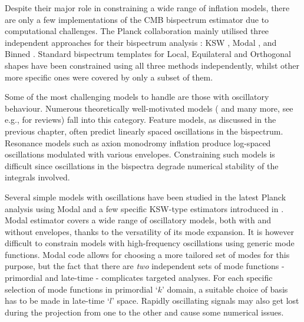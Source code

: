 \documentclass[a4paper,12pt,times,custombib,print,index]{Classes/PhDThesisPSnPDF} %
\providecommand{\DIFadd}[1]{{\protect\color{blue}\uwave{#1}}} %
\providecommand{\DIFaddbegin}{} %
\providecommand{\DIFaddend}{} %
\newcommand{\DIFaddincludegraphics}[2][]{{\color{blue}\fbox{\DIFOincludegraphics[#1]{#2}}}} %
\DeclareRobustCommand{\DIFaddbegin}{\DIFOaddbegin \let\includegraphics\DIFaddincludegraphics} %
\DeclareRobustCommand{\DIFaddend}{\DIFOaddend \let\includegraphics\DIFOincludegraphics} %
\begin{document}
Despite their major role in constraining a wide range of inflation models, there are only a few implementations of the CMB bispectrum estimator due to computational challenges. The Planck collaboration mainly utilised three independent approaches for their bispectrum analysis \cite{PlanckCollaboration2013,PlanckCollaboration2015,PlanckCollaboration2018}: KSW \cite{Komatsu2005}, Modal \cite{Fergusson2012}, and Binned \cite{Bucher2010}. Standard bispectrum templates for Local, Equilateral and Orthogonal shapes have been constrained using all three methods independently, whilst other more specific ones were covered by only a subset of them.

Some of the most challenging models to handle are those with oscillatory behaviour. Numerous theoretically well-motivated models (\cite{Chen2010foldedResonant,Meerburg2009signatures,Meerburg2010nbd,Meerburg2011cutoff,Hazra2014} and many more, see e.g., \cite{Chen2010review,Chen2016} for reviews) fall into this category. Feature models, as discussed in the previous chapter, often predict linearly spaced oscillations in the bispectrum. Resonance models such as axion monodromy inflation \cite{Silverstein2008monodromy,Flauger2010monodromy} produce log-spaced oscillations modulated with various envelopes. Constraining such models is difficult since oscillations in the bispectra degrade \DIFaddbegin \DIFadd{the }\DIFaddend numerical stability of the integrals involved.

Several simple models with oscillations have been studied in the latest Planck analysis using Modal and a few specific KSW-type estimators introduced in \cite{Munchmeyer2014}. Modal estimator covers a wide range of oscillatory models, both with and without envelopes, thanks to the versatility of its mode expansion. It is however difficult to constrain models with high-frequency oscillations using generic mode functions. Modal code allows for choosing a more tailored set of modes for this purpose, but the fact that there are \textit{two} independent sets of mode functions - primordial and late-time - complicates targeted analyses. For each specific selection of mode functions in \DIFaddbegin \DIFadd{the }\DIFaddend primordial `$k$' domain, a suitable choice of basis has to be made in \DIFaddbegin \DIFadd{the }\DIFaddend late-time `$l$' space. Rapidly oscillating signals may also get lost during the projection from one to the other and cause some numerical issues.
\end{document}
